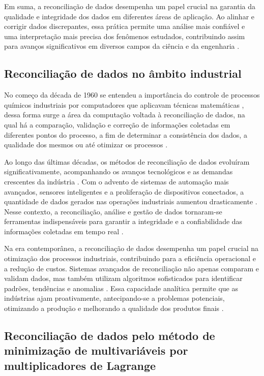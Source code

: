 Em suma, a reconciliação de dados desempenha um papel crucial na garantia da qualidade e integridade dos dados em diferentes áreas de aplicação. Ao alinhar e corrigir dados discrepantes, essa prática permite uma análise mais confiável e uma interpretação mais precisa dos fenômenos estudados, contribuindo assim para avanços significativos em diversos campos da ciência e da engenharia \cite{datarecshakar}.
    
\subsection{Reconciliação de dados no âmbito industrial}
    
No começo da década de 1960 se entendeu a importância do controle de processos químicos industriais por computadores que aplicavam técnicas matemáticas \cite{computecontrol}, dessa forma surge a área da computação voltada à reconciliação de dados, na qual há a comparação, validação e correção de informações coletadas em diferentes pontos do processo, a fim de determinar a consistência dos dados, a qualidade dos mesmos ou até otimizar os processos \cite{datarecshakar}.
    
Ao longo das últimas décadas, os métodos de reconciliação de dados evoluíram significativamente, acompanhando os avanços tecnológicos e as demandas crescentes da indústria \cite{datarecsurvey}. Com o advento de sistemas de automação mais avançados, sensores inteligentes e a proliferação de dispositivos conectados, a quantidade de dados gerados nas operações industriais aumentou drasticamente \cite{datarecsurvey}. Nesse contexto, a reconciliação, análise e gestão de dados tornaram-se ferramentas indispensáveis para garantir a integridade e a confiabilidade das informações coletadas em tempo real \cite{aularecon}.
    
Na era contemporânea, a reconciliação de dados desempenha um papel crucial na otimização dos processos industriais, contribuindo para a eficiência operacional e a redução de custos. Sistemas avançados de reconciliação não apenas comparam e validam dados, mas também utilizam algoritmos sofisticados para identificar padrões, tendências e anomalias \cite{datarecragnoli}. Essa capacidade analítica permite que as indústrias ajam proativamente, antecipando-se a problemas potenciais, otimizando a produção e melhorando a qualidade dos produtos finais \cite{datarecshakar}.

\subsection{Reconciliação de dados pelo método de minimização de multivariáveis por multiplicadores de Lagrange}
    
